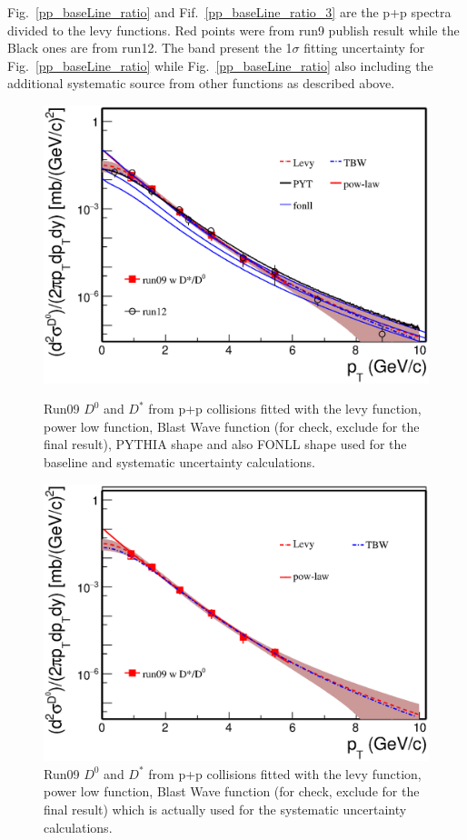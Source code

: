 Fig.~\ref{pp_baseLine_ratio} and Fif.~\ref{pp_baseLine_ratio_3} are the p+p spectra divided to the levy functions. Red points were from run9 publish result while the Black ones are from run12. The band present the 1$\sigma$ fitting uncertainty for Fig.~\ref{pp_baseLine_ratio} while Fig.~\ref{pp_baseLine_ratio} also including the additional systematic source from other functions as described above.

\begin{figure}[htbp]
\begin{minipage}[htbp]{0.47\linewidth}
\centering
\includegraphics[width=1.0\textwidth,angle=0]{figure/Run14_D0HFT/pp_baseLine1.eps}
\caption{Run09 $D^{0}$ and $D^*$ from p+p collisions fitted with the levy function, power low function, Blast Wave function (for check, exclude for the final result), PYTHIA shape and also FONLL shape used for the baseline and systematic uncertainty calculations. \label{pp_baseLine1}}
\end{minipage}
\hfill
\begin{minipage}[htbp]{0.47\linewidth}
\centering
\includegraphics[width=1.0\textwidth,angle=0]{figure/Run14_D0HFT/pp_baseLine2.eps}
\caption{Run09 $D^{0}$ and $D^*$ from p+p collisions fitted with the levy function, power low function, Blast Wave function (for check, exclude for the final result) which is actually used for the systematic uncertainty calculations. \label{pp_baseLine2}}
\end{minipage}
\end{figure}

